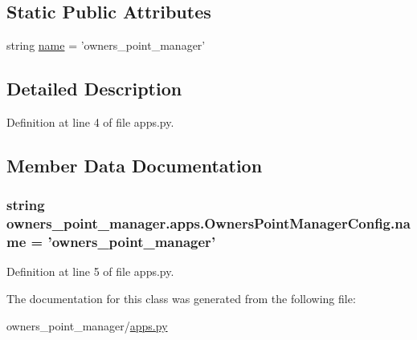 \subsection*{Static Public Attributes}
\begin{DoxyCompactItemize}
\item 
string \hyperlink{classowners__point__manager_1_1apps_1_1OwnersPointManagerConfig_a750524d947182f8f8c5ded9493494350}{name} = 'owners\-\_\-point\-\_\-manager'
\end{DoxyCompactItemize}


\subsection{Detailed Description}


Definition at line 4 of file apps.\-py.



\subsection{Member Data Documentation}
\hypertarget{classowners__point__manager_1_1apps_1_1OwnersPointManagerConfig_a750524d947182f8f8c5ded9493494350}{
\subsubsection[{name}]{\setlength{\rightskip}{0pt plus 5cm}string owners\-\_\-point\-\_\-manager.\-apps.\-Owners\-Point\-Manager\-Config.\-name = 'owners\-\_\-point\-\_\-manager'\hspace{0.3cm}{\ttfamily [static]}}}\label{classowners__point__manager_1_1apps_1_1OwnersPointManagerConfig_a750524d947182f8f8c5ded9493494350}


Definition at line 5 of file apps.\-py.



The documentation for this class was generated from the following file\-:\begin{DoxyCompactItemize}
\item 
owners\-\_\-point\-\_\-manager/\hyperlink{owners__point__manager_2apps_8py}{apps.\-py}\end{DoxyCompactItemize}
